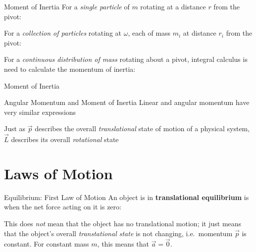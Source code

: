 \documentclass[12pt,compress,aspectratio=169]{beamer}
\begin{document}
\begin{frame}{Moment of Inertia}
  For a \emph{single particle} of $m$ rotating at a distance $r$ from the pivot:
  

  For a \emph{collection of particles} rotating at $\omega$, each of mass
  $m_i$ at distance $r_i$ from the pivot:


  For a \emph{continuous distribution of mass} rotating about a pivot, integral
  calculus is need to calculate the momentum of inertia:

\end{frame}



\begin{frame}{Moment of Inertia}
  \centering
\end{frame}



\begin{frame}{Angular Momentum and Moment of Inertia}
  Linear and angular momentum have very similar expressions
    
  \vspace{-.3in}{\large
    \begin{align*}
      \vec p&=m\vec v\\
      \vec L&=I\vec\omega
    \end{align*}
  }
  
  Just as $\vec p$ describes the overall \emph{translational} state of motion
  of a physical system, $\vec L$ describes its overall \emph{rotational} state
\end{frame}



\section{Laws of Motion}

\begin{frame}{Equilibrium: First Law of Motion}
  An object is in \textbf{translational equilibrium} is when the net force
  acting on it is zero:
  

  This does \emph{not} mean that the object has no translational motion; it
  just means that the object's overall \emph{transtational state} is not
  changing, i.e.\ momentum $\vec p$ is constant. For constant mass $m$,
  this means that $\vec a=\vec 0$.
\end{frame}
\end{document}
